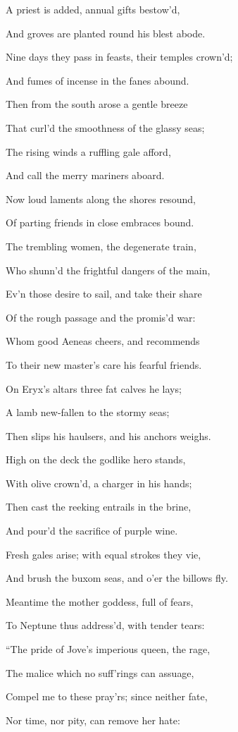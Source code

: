 A priest is added, annual gifts bestow’d,

And groves are planted round his blest abode.

Nine days they pass in feasts, their temples crown’d;

And fumes of incense in the fanes abound.

Then from the south arose a gentle breeze

That curl’d the smoothness of the glassy seas;

The rising winds a ruffling gale afford,

And call the merry mariners aboard.

Now loud laments along the shores resound,

Of parting friends in close embraces bound.

The trembling women, the degenerate train,

Who shunn’d the frightful dangers of the main,

Ev’n those desire to sail, and take their share

Of the rough passage and the promis’d war:

Whom good Aeneas cheers, and recommends

To their new master’s care his fearful friends.

On Eryx’s altars three fat calves he lays;

A lamb new-fallen to the stormy seas;

Then slips his haulsers, and his anchors weighs.

High on the deck the godlike hero stands,

With olive crown’d, a charger in his hands;

Then cast the reeking entrails in the brine,

And pour’d the sacrifice of purple wine.

Fresh gales arise; with equal strokes they vie,

And brush the buxom seas, and o’er the billows fly.

Meantime the mother goddess, full of fears,

To Neptune thus address’d, with tender tears:

“The pride of Jove’s imperious queen, the rage,

The malice which no suff’rings can assuage,

Compel me to these pray’rs; since neither fate,

Nor time, nor pity, can remove her hate:

